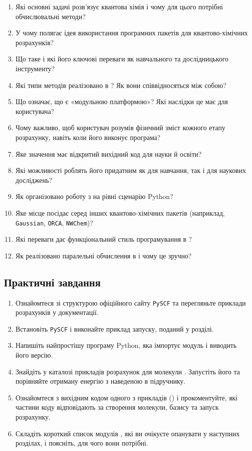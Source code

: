 \begin{enumerate}
    \item Які основні задачі розв’язує квантова хімія і чому для цього потрібні обчислювальні методи?
    \item У чому полягає ідея використання програмних пакетів для квантово-хімічних розрахунків?
    \item Що таке \PySCF{} і які його ключові переваги як навчального та дослідницького інструменту?
    \item Які типи методів реалізовано в \PySCF{}? Як вони співвідносяться між собою?
    \item Що означає, що \PySCF{} є «модульною платформою»? Які наслідки це має для користувача?
    \item Чому важливо, щоб користувач розумів фізичний зміст кожного етапу розрахунку, навіть коли його виконує програма?
    \item Яке значення має відкритий вихідний код \PySCF{} для науки й освіти?
    \item Які можливості \PySCF{} роблять його придатним як для навчання, так і для наукових досліджень?
    \item Як організовано роботу з \PySCF{} на рівні сценарію Python?
    \item Яке місце \PySCF{} посідає серед інших квантово-хімічних пакетів (наприклад, \texttt{Gaussian}, \texttt{ORCA}, \texttt{NWChem})?
    \item Які переваги дає функціональний стиль програмування в \PySCF?
    \item Як реалізовано паралельні обчислення в \PySCF{} і чому це зручно?
\end{enumerate}

\subsection*{Практичні завдання}

\begin{enumerate}
    \item Ознайомтеся зі структурою офіційного сайту \texttt{PySCF} та перегляньте приклади розрахунків у документації.
    \item Встановіть \texttt{PySCF} і виконайте приклад запуску, поданий у розділі.
    \item Напишіть найпростішу програму Python, яка імпортує модуль  і виводить його версію.
    \item Знайдіть у каталозі прикладів \PySCF{} розрахунок для молекули .
    Запустіть його та порівняйте отриману енергію з наведеною в підручнику.
    \item Ознайомтеся з вихідним кодом одного з прикладів () і прокоментуйте, які частини коду відповідають за створення молекули, базису та запуск розрахунку.
    \item Складіть короткий список модулів \PySCF, які ви очікуєте опанувати у наступних розділах, і поясніть, для чого вони потрібні.
\end{enumerate}
